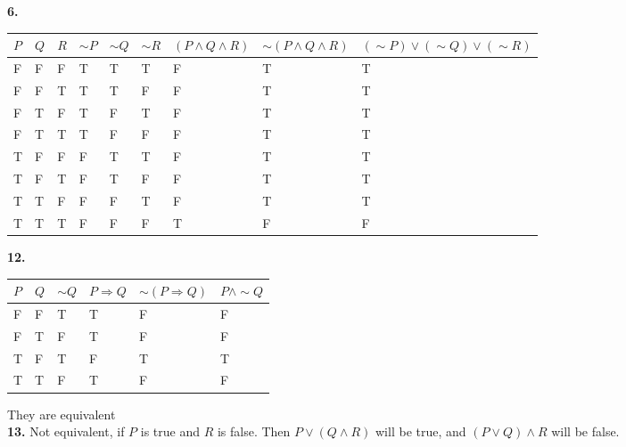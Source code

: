 \documentclass[12pt]{article}
\begin{document}
\textbf{6.}
\begin{table}[!h]
\centering
\begin{tabular}{|l|l|l|l|l|l|l|l|l|}
\hline
\rowcolor[HTML]{EFEFEF} 
$P$ & $Q$ & $R$ & $\sim P$ & $\sim Q$ & $\sim R$ & $(P \land Q \land R)$ & $\sim (P \land Q \land R)$ & $(\sim P) \lor (\sim Q) \lor (\sim R)$ \\ \hline
F & F & F & T & T & T & F & T & T \\ \hline
F & F & T & T & T & F & F & T & T \\ \hline
F & T & F & T & F & T & F & T & T \\ \hline
F & T & T & T & F & F & F & T & T \\ \hline
T & F & F & F & T & T & F & T & T \\ \hline
T & F & T & F & T & F & F & T & T \\ \hline
T & T & F & F & F & T & F & T & T \\ \hline
T & T & T & F & F & F & T & F & F \\ \hline
\end{tabular}
\end{table}
\newpage
\textbf{12.}
\begin{table}[!h]
\centering
\begin{tabular}{|l|l|l|l|l|l|}
\hline
\rowcolor[HTML]{EFEFEF} 
$P$ & $Q$ & $\sim Q$ & $P \Rightarrow Q$ & $\sim(P \Rightarrow Q)$ & $P \land \sim Q$ \\ \hline
F & F & T & T & F & F \\ \hline
F & T & F & T & F & F \\ \hline
T & F & T & F & T & T \\ \hline
T & T & F & T & F & F \\ \hline
\end{tabular}
\end{table}
They are equivalent\\
\textbf{13.} Not equivalent, if $P$ is true and $R$ is false. Then $P \lor (Q \land R)$ will be true, and $(P \lor Q) \land R$ will be false.
\end{document}
